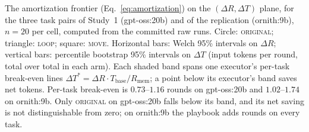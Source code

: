 \caption{The amortization frontier (Eq.~\ref{eq:amortization}) on the $(\Delta R, \Delta T)$ plane, for the three task pairs of Study~1 (gpt-oss:20b) and of the replication (ornith:9b), $n=20$ per cell, computed from the committed raw runs. Circle: \textsc{original}; triangle: \textsc{loop}; square: \textsc{move}. Horizontal bars: Welch 95\% intervals on $\Delta R$; vertical bars: percentile bootstrap 95\% intervals on $\Delta T$ (input tokens per round, total over total in each arm). Each shaded band spans one executor's per-task break-even lines $\Delta T^{*} = \Delta R \cdot T_{\mathrm{base}} / R_{\mathrm{mem}}$; a point below its executor's band saves net tokens. Per-task break-even is $0.73$--$1.16$ rounds on gpt-oss:20b and $1.02$--$1.74$ on ornith:9b. Only \textsc{original} on gpt-oss:20b falls below its band, and its net saving is not distinguishable from zero; on ornith:9b the playbook adds rounds on every task.}
